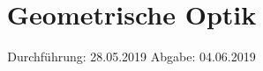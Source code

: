 

\subject{V406}
\title{Geometrische Optik}
\date{%
  Durchführung: 28.05.2019
  \hspace{3em}
  Abgabe: 04.06.2019
}



\maketitle
\thispagestyle{empty}
\tableofcontents
\newpage






\printbibliography{}


